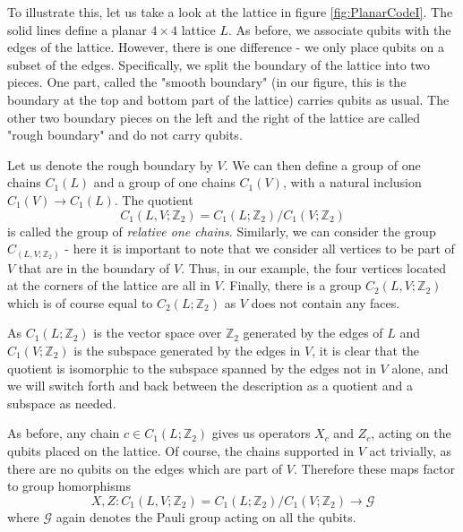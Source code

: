\documentclass[a4paper, draft]{article}
\theoremstyle{own}
\theoremstyle{remark}
\newcommand{\Z}{\mathbb{Z}}
\begin{document}
To illustrate this, let us take a look at the lattice in figure \ref{fig:PlanarCodeI}. The solid lines define a planar $4 \times 4$ lattice $L$. As before, we associate qubits with the edges of the lattice. However, there is one difference - we only place qubits on a subset of the edges. Specifically, we split the boundary of the lattice into two pieces. One part, called the "smooth boundary" (in our figure, this is the boundary at the top and bottom part of the lattice) carries qubits as usual. The other two boundary pieces on the left and the right of the lattice are called "rough boundary" and do not carry qubits.

Let us denote the rough boundary by $V$. We can then define a group of one chains $C_1(L)$ and a group of one chains $C_1(V)$, with a natural inclusion $C_1(V) \rightarrow C_1(L)$. The quotient 
$$
C_1(L,V;\Z_2) = C_1(L;\Z_2) / C_1(V;\Z_2)
$$
is called the group of \emph{relative one chains}. Similarly, we can consider the group $C_(L,V;\Z_2)$ - here it is important to note that we consider all vertices to be part of $V$ that are in the boundary of $V$. Thus, in our example, the four vertices located at the corners of the lattice are all in $V$. Finally, there is a group $C_2(L,V;\Z_2)$ which is of course equal to $C_2(L;\Z_2)$ as $V$ does not contain any faces.

As $C_1(L;\Z_2)$ is the vector space over $\Z_2$ generated by the edges of $L$ and $C_1(V;\Z_2)$ is the subspace generated by the edges in $V$, it is clear that the quotient is isomorphic to the subspace spanned by the edges not in $V$ alone, and we will switch forth and back between the description as a quotient and a subspace as needed. 

As before, any chain $c \in C_1(L;\Z_2)$ gives us operators $X_c$ and $Z_c$, acting on the qubits placed on the lattice. Of course, the chains supported in $V$ act trivially, as there are no qubits on the edges which are part of $V$. Therefore these maps factor to group homorphisms
$$
X, Z \colon C_1(L,V; \Z_2) = C_1(L;\Z_2) / C_1(V;\Z_2) \rightarrow \mathcal{G}
$$
where $\mathcal{G}$ again denotes the Pauli group acting on all the qubits. 
\end{document}
